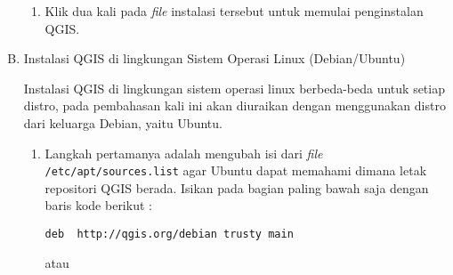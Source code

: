 \begin{enumerate}[A.]
\begin{enumerate}[1.]
\item Klik dua kali pada \textit{file} instalasi tersebut untuk memulai penginstalan QGIS.

\end{enumerate}

\item Instalasi QGIS di lingkungan Sistem Operasi Linux (Debian/Ubuntu)

Instalasi QGIS di lingkungan sistem operasi linux berbeda-beda untuk setiap distro, pada pembahasan kali ini akan diuraikan dengan menggunakan distro dari keluarga Debian, yaitu Ubuntu.

\begin{enumerate}[1.]

\item Langkah pertamanya adalah mengubah isi dari \textit{file} \verb|/etc/apt/sources.list| agar Ubuntu dapat memahami dimana letak repositori QGIS berada. Isikan pada bagian paling bawah saja dengan baris kode berikut :

\begin{verbatim}
deb  http://qgis.org/debian trusty main
\end{verbatim}

atau 

\begin{verbatim}
\end{verbatim}

\end{enumerate}

\end{enumerate}